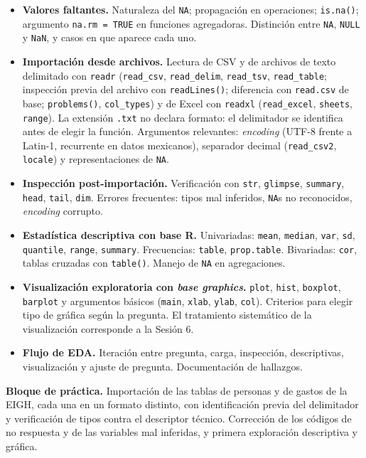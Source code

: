 \documentclass[11pt,letterpaper]{article}
\newcommand{\orange}[1]{{\color{redorange}#1}}
\newcommand{\practica}[1]{%
  \medskip\noindent\textbf{\orange{Bloque de práctica.}} #1\par%
}
\begin{document}
\begin{itemize}[leftmargin=*, itemsep=2pt]
    \item \textbf{Valores faltantes.} Naturaleza del \texttt{NA}; propagación en operaciones; \texttt{is.na()}; argumento \texttt{na.rm = TRUE} en funciones agregadoras. Distinción entre \texttt{NA}, \texttt{NULL} y \texttt{NaN}, y casos en que aparece cada uno.
    \item \textbf{Importación desde archivos.} Lectura de CSV y de archivos de texto delimitado con \texttt{readr} (\texttt{read\_csv}, \texttt{read\_delim}, \texttt{read\_tsv}, \texttt{read\_table}; inspección previa del archivo con \texttt{readLines()}; diferencia con \texttt{read.csv} de base; \texttt{problems()}, \texttt{col\_types}) y de Excel con \texttt{readxl} (\texttt{read\_excel}, \texttt{sheets}, \texttt{range}). La extensión \texttt{.txt} no declara formato: el delimitador se identifica antes de elegir la función. Argumentos relevantes: \textit{encoding} (UTF-8 frente a Latin-1, recurrente en datos mexicanos), separador decimal (\texttt{read\_csv2}, \texttt{locale}) y representaciones de \texttt{NA}.
    \item \textbf{Inspección post-importación.} Verificación con \texttt{str}, \texttt{glimpse}, \texttt{summary}, \texttt{head}, \texttt{tail}, \texttt{dim}. Errores frecuentes: tipos mal inferidos, \texttt{NA}s no reconocidos, \textit{encoding} corrupto.
    \item \textbf{Estadística descriptiva con base R.} Univariadas: \texttt{mean}, \texttt{median}, \texttt{var}, \texttt{sd}, \texttt{quantile}, \texttt{range}, \texttt{summary}. Frecuencias: \texttt{table}, \texttt{prop.table}. Bivariadas: \texttt{cor}, tablas cruzadas con \texttt{table()}. Manejo de \texttt{NA} en agregaciones.
    \item \textbf{Visualización exploratoria con \textit{base graphics}.} \texttt{plot}, \texttt{hist}, \texttt{boxplot}, \texttt{barplot} y argumentos básicos (\texttt{main}, \texttt{xlab}, \texttt{ylab}, \texttt{col}). Criterios para elegir tipo de gráfica según la pregunta. El tratamiento sistemático de la visualización corresponde a la Sesión 6.
    \item \textbf{Flujo de EDA.} Iteración entre pregunta, carga, inspección, descriptivas, visualización y ajuste de pregunta. Documentación de hallazgos.
\end{itemize}

\practica{Importación de las tablas de personas y de gastos de la EIGH, cada una en un formato distinto, con identificación previa del delimitador y verificación de tipos contra el descriptor técnico. Corrección de los códigos de no respuesta y de las variables mal inferidas, y primera exploración descriptiva y gráfica.}
\end{document}
